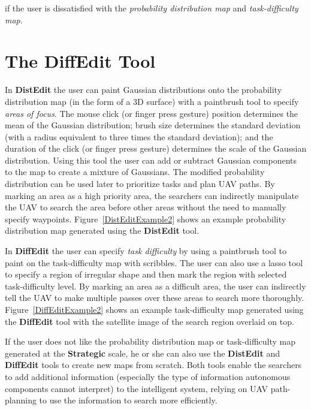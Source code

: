 if the user is dissatisfied with the \textit{probability distribution map} and \textit{task-difficulty map}.

\section{The DiffEdit Tool}
\label{}



In \textbf{DistEdit} the user can paint Gaussian distributions onto the probability distribution map (in the form of a 3D surface) with a paintbrush tool to specify \textit{areas of focus}. The mouse click (or finger press gesture) position determines the mean of the Gaussian distribution; brush size determines the standard deviation (with a radius equivalent to three times the standard deviation); and the duration of the click (or finger press gesture) determines the scale of the Gaussian distribution. Using this tool the user can add or subtract Gaussian components to the map to create a mixture of Gaussians. The modified probability distribution can be used later to prioritize tasks and plan UAV paths. By marking an area as a high priority area, the searchers can indirectly manipulate the UAV to search the area before other areas without the need to manually specify waypoints. Figure~\ref{DistEditExample2} shows an example probability distribution map generated using the \textbf{DistEdit} tool.

In \textbf{DiffEdit} the user can specify \textit{task difficulty} by using a paintbrush tool to paint on the task-difficulty map with scribbles. The user can also use a lasso tool to specify a region of irregular shape and then mark the region with selected task-difficulty level. By marking an area as a difficult area, the user can indirectly tell the UAV to make multiple passes over these areas to search more thoroughly. Figure~\ref{DiffEditExample2} shows an example task-difficulty map generated using the \textbf{DiffEdit} tool with the satellite image of the search region overlaid on top.

If the user does not like the probability distribution map or task-difficulty map generated at the \textbf{Strategic} scale, he or she can also use the \textbf{DistEdit} and \textbf{DiffEdit} tools to create new maps from scratch. Both tools enable the searchers to add additional information (especially the type of information autonomous components cannot interpret) to the intelligent system, relying on UAV path-planning to use the information to search more efficiently.




